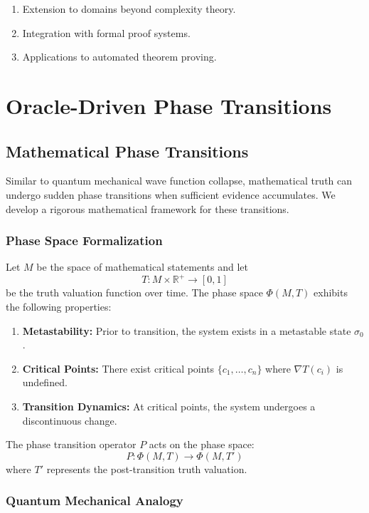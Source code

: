 \documentclass[11pt]{article}
\begin{document}
\begin{enumerate}[label=(\arabic*)]
    \item Extension to domains beyond complexity theory.
    \item Integration with formal proof systems.
    \item Applications to automated theorem proving.
\end{enumerate}

\section{Oracle-Driven Phase Transitions}

\subsection{Mathematical Phase Transitions}

Similar to quantum mechanical wave function collapse, mathematical truth can undergo sudden phase transitions when sufficient evidence accumulates. We develop a rigorous mathematical framework for these transitions.

\subsubsection{Phase Space Formalization}

Let $M$ be the space of mathematical statements and let
\[
T: M \times \mathbb{R}^{+} \to [0,1]
\]
be the truth valuation function over time. The phase space $\Phi(M,T)$ exhibits the following properties:
\begin{enumerate}[label=(\arabic*)]
    \item \textbf{Metastability:} Prior to transition, the system exists in a metastable state $\sigma_0$.
    \item \textbf{Critical Points:} There exist critical points $\{c_1, \dots, c_n\}$ where $\nabla T(c_i)$ is undefined.
    \item \textbf{Transition Dynamics:} At critical points, the system undergoes a discontinuous change.
\end{enumerate}
The phase transition operator $P$ acts on the phase space:
\[
P: \Phi(M,T) \to \Phi(M,T')
\]
where $T'$ represents the post-transition truth valuation.

\subsubsection{Quantum Mechanical Analogy}
\end{document}
